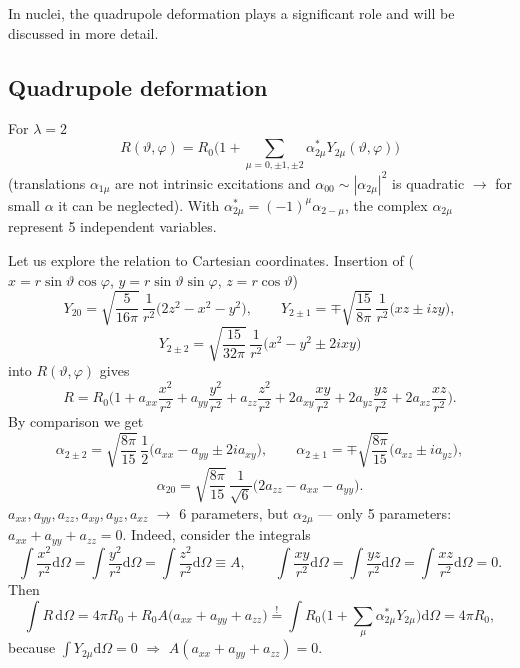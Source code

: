\documentclass[11pt,a4paper]{article}
\newcommand{\ud}{\mathrm{d}}
\begin{document}
\begin{center}
\end{center}
In nuclei, the quadrupole deformation plays a significant role and will be discussed in more detail.

\subsection{Quadrupole deformation}
For $\lambda=2$
\[
R(\vartheta,\varphi)=R_0\Big(1+\sum_{\mu=0,\pm1,\pm2}\alpha^*_{2\mu}Y_{2\mu}(\vartheta,\varphi)\Big)
\]
(translations $\alpha_{1\mu}$ are not intrinsic excitations and $\alpha_{00}\sim|\alpha_{2\mu}|^2$ is quadratic $\to$ for small $\alpha$ it can be neglected). With $\alpha^*_{2\mu}=(-1)^\mu\alpha_{2-\mu}$, the complex $\alpha_{2\mu}$ represent 5 independent variables.

Let us explore the relation to Cartesian coordinates. Insertion of ($x=r\sin\vartheta\cos\varphi$, $y=r\sin\vartheta\sin\varphi$, $z=r\cos\vartheta$)
\[
Y_{20}=\sqrt{\frac{5}{16\pi}}\,\frac{1}{r^2}\big(2z^2-x^2-y^2\big),\qquad
Y_{2\pm1}=\mp\sqrt{\frac{15}{8\pi}}\,\frac{1}{r^2}\big(xz\pm izy\big),
\]
\[
Y_{2\pm2}=\sqrt{\frac{15}{32\pi}}\,\frac{1}{r^2}\big(x^2-y^2\pm2ixy\big)
\]
into $R(\vartheta,\varphi)$ gives
\[
R=R_0\Big(1+a_{xx}\frac{x^2}{r^2}+a_{yy}\frac{y^2}{r^2}+a_{zz}\frac{z^2}{r^2}+2a_{xy}\frac{xy}{r^2}+2a_{yz}\frac{yz}{r^2}+2a_{xz}\frac{xz}{r^2}\Big).
\]
By comparison we get
\[
\alpha_{2\pm2}=\sqrt{\frac{8\pi}{15}}\,\frac12\big(a_{xx}-a_{yy}\pm2ia_{xy}\big),\qquad
\alpha_{2\pm1}=\mp\sqrt{\frac{8\pi}{15}}\big(a_{xz}\pm ia_{yz}\big),
\]
\[
\alpha_{20}=\sqrt{\frac{8\pi}{15}}\,\frac{1}{\sqrt6}\big(2a_{zz}-a_{xx}-a_{yy}\big).
\]
$a_{xx},a_{yy},a_{zz},a_{xy},a_{yz},a_{xz}$ $\to$ 6 parameters, but $\alpha_{2\mu}$ --- only 5 parameters: $a_{xx}+a_{yy}+a_{zz}=0$.
Indeed, consider the integrals
\[
\int\frac{x^2}{r^2}\ud\Omega=\int\frac{y^2}{r^2}\ud\Omega=\int\frac{z^2}{r^2}\ud\Omega\equiv A,
\qquad
\int\frac{xy}{r^2}\ud\Omega=\int\frac{yz}{r^2}\ud\Omega=\int\frac{xz}{r^2}\ud\Omega=0 .
\]
Then
\[
\int R\,\ud\Omega=4\pi R_0+R_0A\big(a_{xx}+a_{yy}+a_{zz}\big)
\overset{!}{=}\int R_0\Big(1+\sum_\mu\alpha^*_{2\mu}Y_{2\mu}\Big)\ud\Omega=4\pi R_0 ,
\]
because $\int Y_{2\mu}\ud\Omega=0$ $\Rightarrow$ $A(a_{xx}+a_{yy}+a_{zz})=0$.
\end{document}

